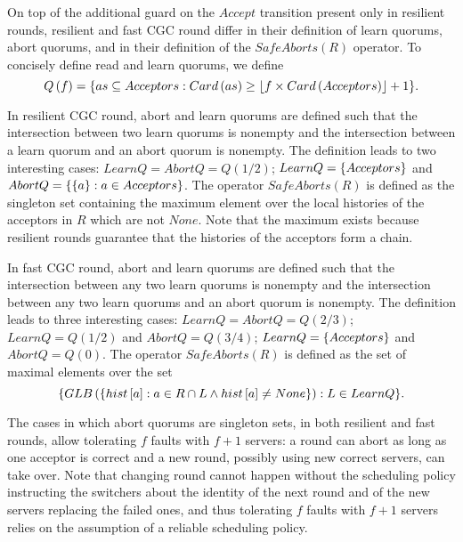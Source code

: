 On top of the additional guard on the $Accept$ transition present only
in resilient rounds, resilient and fast CGC round differ in
their definition of learn quorums, abort quorums, and in their
definition of the $SafeAborts\left( R \right)$ operator.
To concisely define read and learn quorums, we define 
\begin{equation}
    Q\left( f \right) = \aset{as \subseteq Acceptors :
        Card\left(as\right) \geq \left\lfloor f\times Card\left(
    Acceptors \right)\right\rfloor + 1}.
\end{equation}

In resilient CGC round, abort and learn quorums are defined such
that the intersection between two learn quorums is nonempty and the
intersection between a learn quorum and an abort quorum is nonempty.
The definition leads to two interesting cases: $LearnQ = AbortQ =
Q\left( 1/2 \right)$; $LearnQ = \left\{Acceptors\right\}$ and $AbortQ =
\left\{\left\{a\right\} : a \in Acceptors\right\}$. The operator $SafeAborts\left( R
\right)$ is defined as the singleton set containing the maximum
element over the local histories of the acceptors in $R$ which are not
$None$. Note that the maximum exists because resilient rounds
guarantee that the histories of the acceptors form a chain.

In fast CGC round, abort and learn quorums are defined such that
the intersection between any two learn quorums is nonempty and the
intersection between any two learn quorums and an abort quorum is
nonempty.  The definition leads to three interesting cases: $LearnQ =
AbortQ = Q\left( 2/3 \right)$; $LearnQ = Q\left( 1/2 \right)$ and
$AbortQ = Q\left( 3/4 \right)$; $LearnQ = \left\{Acceptors\right\}$ and
$AbortQ = Q\left( 0 \right)$.
The operator $SafeAborts\left( R \right)$ is defined as the set of
maximal elements over the set 
\begin{equation}
\aset{GLB\left( \aset{hist\left[ a
\right] : a \in R \cap L \wedge hist\left[ a \right]\neq None} \right)
: L \in LearnQ}.
\end{equation}

The cases in which abort quorums are singleton sets, in both
resilient and fast rounds, allow tolerating
$f$ faults with $f+1$ servers: a round can abort as long as one
acceptor is correct and a new round, possibly using new correct
servers, can take over. Note that changing round cannot happen
without the scheduling policy instructing the switchers about the
identity of the next round and of the new servers replacing the failed ones, and thus tolerating $f$ faults with
$f+1$ servers relies on the assumption of a reliable scheduling policy.

